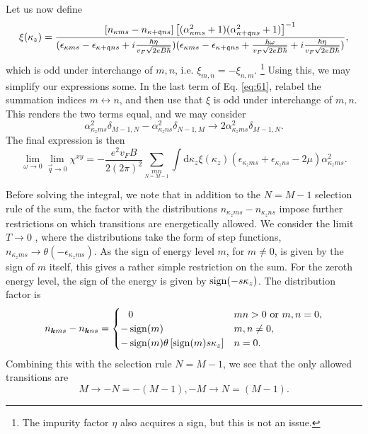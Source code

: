 Let us now define
\begin{equation}
  \xi(\kappa_z) = \frac{[n_{\kappa ms} - n_{\kappa + \mathfrak{q} ns}]
  \left[ (\alpha _{\kappa ms}^2 + 1) (\alpha _{\kappa +\mathfrak{q} ns}^2 + 1) \right]^{-1}
  }{
    (\epsilon _{\kappa m s} - \epsilon _{\kappa +\mathfrak{q}ns} + i \frac{\hbar  \eta }{v_F\sqrt{2 e B \hbar }})
    (\epsilon _{\kappa m s} - \epsilon _{\kappa +\mathfrak{q}ns} + \frac{\hbar \omega }{v_F \sqrt{2 e B \hbar }} + i \frac{\hbar  \eta }{v_F\sqrt{2 e B \hbar }})
  },
\end{equation}
which is odd under interchange of \( m,n \), i.e. \( \xi_{m,n} = -\xi _{n,m} \). \footnote{The impurity factor \( \eta \) also acquires a sign, but this is not an issue.}
Using this, we may simplify our expressions some.
In the last term of Eq. \eqref{eq:61}, relabel the summation indices \( m \leftrightarrow n \), and then use that \( \xi \) is odd under interchange of \( m,n \).
This renders the two terms equal, and we may consider
\[
\alpha_{\kappa_z m s}^2 \delta_{M-1,N} - \alpha_{\kappa_z n s}^2 \delta_{N-1, M} \to 2 \alpha_{\kappa_z m s}^2 \delta_{M-1, N}.
\]
The final expression is then
\begin{equation}
  \label{eq:62}
  \lim_{\omega \to 0} \lim_{\vec{q} \to 0} \chi^{xy} =
  -\frac{e^2 v_F B}{2 (2 \pi)^2} \sum\limits_{\underset{N=M-1}{mn}}
  \int \mathrm{d}\kappa_z \xi(\kappa_z)
  (\epsilon_{\kappa_z m s} + \epsilon_{\kappa_z n s} - 2 \mu) \alpha_{\kappa_z m s}^2.
\end{equation}

Before solving the integral, we note that in addition to the  \( N=M-1 \) selection rule of the sum, the factor with the distributions \( n_{\kappa_z m s} - n_{\kappa_z n s} \) impose further restrictions on which transitions are energetically allowed.
We consider the limit \( T \to 0 \) , where the distributions take the form of step functions, \( n_{\kappa_z m s} \to \theta(-\epsilon_{\kappa_z m s}) \).
As the sign of energy level \( m \), for \( m \neq 0 \), is given by the sign of \( m \) itself, this gives a rather simple restriction on the sum.
For the zeroth energy level, the sign of the energy is given by \( \operatorname{sign}(-s\kappa_z) \).
The distribution factor is
\begin{equation}
  n_{\bm{k} m s} - n_{\bm{k} n s} =
  \begin{cases}
    \phantom{-} 0 & m n > 0 \text{ or  } m,n = 0,\\
    - \operatorname{sign}(m) & m,n \neq 0,\\
    -\operatorname{sign}(m) \theta\left[\operatorname{sign}(m) s \kappa_z\right] & n = 0.
  \end{cases}
\end{equation}
Combining this with the selection rule \( N=M-1 \), we see that the only allowed transitions are
\[ M \to -N = -(M-1), -M \to N = (M-1). \]

